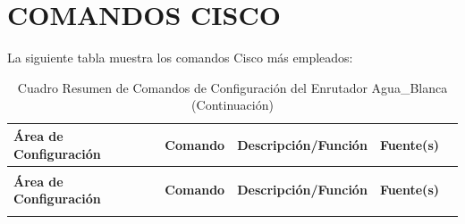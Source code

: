 \documentclass[a5paper]{book}%
\begin{document}
\chapter{COMANDOS CISCO}

La siguiente tabla muestra los comandos Cisco más empleados:


\begin{longtable}{|p{2cm}|p{3cm}|p{4cm}|p{2cm}|p{2cm}|}
\hline
\textbf{Área de Configuración} & \textbf{Comando} & \textbf{Descripción/Función} & \textbf{Fuente(s)} \\
\hline
\endfirsthead
\caption{Cuadro Resumen de Comandos de Configuración del Enrutador Agua\_Blanca (Continuación)}\\
\hline
\textbf{Área de Configuración} & \textbf{Comando} & \textbf{Descripción/Función} & \textbf{Fuente(s)} \\
\hline
\endhead
\hline
\endfoot


\end{longtable}
\end{document}
